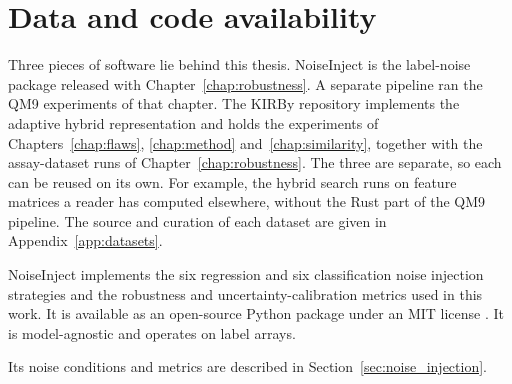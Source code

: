 \chapter{Data and code availability}\label{app:availability}

Three pieces of software lie behind this thesis. NoiseInject is the label-noise package released with Chapter~\ref{chap:robustness}. A separate pipeline ran the QM9 experiments of that chapter. The KIRBy repository implements the adaptive hybrid representation and holds the experiments of Chapters~\ref{chap:flaws}, \ref{chap:method} and~\ref{chap:similarity}, together with the assay-dataset runs of Chapter~\ref{chap:robustness}. The three are separate, so each can be reused on its own. For example, the hybrid search runs on feature matrices a reader has computed elsewhere, without the Rust part of the QM9 pipeline. The source and curation of each dataset are given in Appendix~\ref{app:datasets}.

NoiseInject implements the six regression and six classification noise injection strategies and the robustness and uncertainty-calibration metrics used in this work. It is available as an open-source Python package under an MIT license \citep{noiseinject}. It is model-agnostic and operates on label arrays.

Its noise conditions and metrics are described in Section~\ref{sec:noise_injection}.

